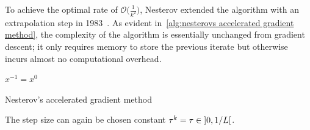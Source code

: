 To achieve the optimal rate of \( \mathcal{O}\bigl( \frac{\num{1}}{k^{\num{2}}} \bigr) \), Nesterov extended the algorithm with an extrapolation step in \num{1983}~\cite{Nesterov1983}.
As evident in~\cref{alg:nesterovs accelerated gradient method}, the complexity of the algorithm is essentially unchanged from gradient descent;
it only requires memory to store the previous iterate but otherwise incurs almost no computational overhead.
\begin{algorithm}
	\DontPrintSemicolon
	\( x^{\num{-1}} = x^{\num{0}} \)\;
	\caption{Nesterov's accelerated gradient method}
	\label{alg:nesterovs accelerated gradient method}
\end{algorithm}
The step size can again be chosen constant \( \tau^k = \tau \in \ointerval{\num{0}}{\num{1}/L} \).
